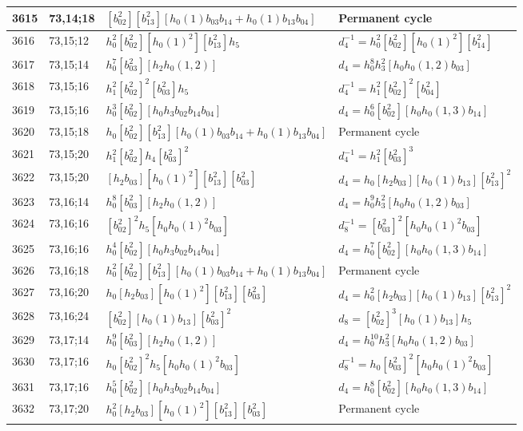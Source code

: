 \documentclass{article}
\begin{document}
\begin{longtable}{|l|l|>{\raggedright\arraybackslash}p{6cm}|>{\raggedright\arraybackslash}p{6cm}|}
\hline
3615 & 73,14;18 & $[b_{02}^2][b_{13}^2][h_0(1)b_{03}b_{14} + h_0(1)b_{13}b_{04}]$ & Permanent cycle\\
\hline
3616 & 73,15;12 & $h_0^2[b_{02}^2][h_0(1)^2][b_{13}^2]h_5$ & $d_{4}^{-1}=h_0^2[b_{02}^2][h_0(1)^2][b_{14}^2]$\\
\hline
3617 & 73,15;14 & $h_0^7[b_{03}^2][h_2h_0(1, 2)]$ &$d_{4}=h_0^8h_3^2[h_0h_0(1, 2)b_{03}]$\\
\hline
3618 & 73,15;16 & $h_1^2[b_{02}^2]^2[b_{03}^2]h_5$ & $d_{4}^{-1}=h_1^2[b_{02}^2]^2[b_{04}^2]$\\
3619 & 73,15;16 & $h_0^3[b_{02}^2][h_0h_3b_{02}b_{14}b_{04}]$ &$d_{4}=h_0^6[b_{02}^2][h_0h_0(1, 3)b_{14}]$\\
\hline
3620 & 73,15;18 & $h_0[b_{02}^2][b_{13}^2][h_0(1)b_{03}b_{14} + h_0(1)b_{13}b_{04}]$ & Permanent cycle\\
\hline
3621 & 73,15;20 & $h_1^2[b_{02}^2]h_4[b_{03}^2]^2$ & $d_{4}^{-1}=h_1^2[b_{03}^2]^3$\\
3622 & 73,15;20 & $[h_2b_{03}][h_0(1)^2][b_{13}^2][b_{03}^2]$ &$d_{4}=h_0[h_2b_{03}][h_0(1)b_{13}][b_{13}^2]^2$\\
\hline
3623 & 73,16;14 & $h_0^8[b_{03}^2][h_2h_0(1, 2)]$ &$d_{4}=h_0^9h_3^2[h_0h_0(1, 2)b_{03}]$\\
\hline
3624 & 73,16;16 & $[b_{02}^2]^2h_5[h_0h_0(1)^2b_{03}]$ & $d_{8}^{-1}=[b_{03}^2]^2[h_0h_0(1)^2b_{03}]$\\
3625 & 73,16;16 & $h_0^4[b_{02}^2][h_0h_3b_{02}b_{14}b_{04}]$ &$d_{4}=h_0^7[b_{02}^2][h_0h_0(1, 3)b_{14}]$\\
\hline
3626 & 73,16;18 & $h_0^2[b_{02}^2][b_{13}^2][h_0(1)b_{03}b_{14} + h_0(1)b_{13}b_{04}]$ & Permanent cycle\\
\hline
3627 & 73,16;20 & $h_0[h_2b_{03}][h_0(1)^2][b_{13}^2][b_{03}^2]$ &$d_{4}=h_0^2[h_2b_{03}][h_0(1)b_{13}][b_{13}^2]^2$\\
\hline
3628 & 73,16;24 & $[b_{02}^2][h_0(1)b_{13}][b_{03}^2]^2$ &$d_{8}=[b_{02}^2]^3[h_0(1)b_{13}]h_5$\\
\hline
3629 & 73,17;14 & $h_0^9[b_{03}^2][h_2h_0(1, 2)]$ &$d_{4}=h_0^{10}h_3^2[h_0h_0(1, 2)b_{03}]$\\
\hline
3630 & 73,17;16 & $h_0[b_{02}^2]^2h_5[h_0h_0(1)^2b_{03}]$ & $d_{8}^{-1}=h_0[b_{03}^2]^2[h_0h_0(1)^2b_{03}]$\\
3631 & 73,17;16 & $h_0^5[b_{02}^2][h_0h_3b_{02}b_{14}b_{04}]$ &$d_{4}=h_0^8[b_{02}^2][h_0h_0(1, 3)b_{14}]$\\
\hline
3632 & 73,17;20 & $h_0^2[h_2b_{03}][h_0(1)^2][b_{13}^2][b_{03}^2]$ & Permanent cycle\\

\end{longtable}
\end{document}
